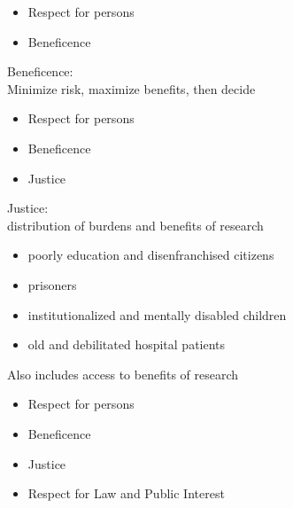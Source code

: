 \documentclass{beamer}
\begin{document}
\begin{frame}

\begin{itemize}
\item Respect for persons
\item Beneficence
\end{itemize}

\end{frame}
\begin{frame}

Beneficence:\\
Minimize risk, maximize benefits, then decide

\end{frame}
\begin{frame}

\begin{itemize}
\item Respect for persons
\item Beneficence
\item Justice
\end{itemize}

\end{frame}
\begin{frame}

Justice:\\
distribution of burdens and benefits of research
\pause
\begin{itemize}
\item poorly education and disenfranchised citizens
\item prisoners
\item institutionalized and mentally disabled children
\item old and debilitated hospital patients
\end{itemize}
\pause
Also includes access to benefits of research

\end{frame}
\begin{frame}

\begin{itemize}
\item Respect for persons
\item Beneficence
\item Justice
\item Respect for Law and Public Interest
\end{itemize}

\end{frame}
\end{document}
